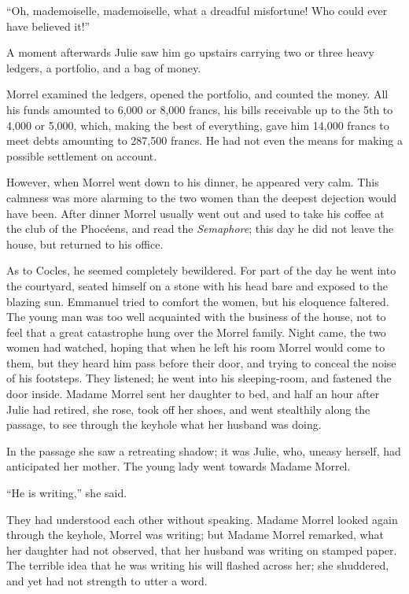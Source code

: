 “Oh, mademoiselle, mademoiselle, what a dreadful misfortune! Who could
ever have believed it!”

A moment afterwards Julie saw him go upstairs carrying two or three
heavy ledgers, a portfolio, and a bag of money.

Morrel examined the ledgers, opened the portfolio, and counted the
money. All his funds amounted to 6,000 or 8,000 francs, his bills
receivable up to the 5th to 4,000 or 5,000, which, making the best of
everything, gave him 14,000 francs to meet debts amounting to 287,500
francs. He had not even the means for making a possible settlement on
account.

However, when Morrel went down to his dinner, he appeared very calm.
This calmness was more alarming to the two women than the deepest
dejection would have been. After dinner Morrel usually went out and
used to take his coffee at the club of the Phocéens, and read the
\textit{Semaphore}; this day he did not leave the house, but returned to his
office.

As to Cocles, he seemed completely bewildered. For part of the day he
went into the courtyard, seated himself on a stone with his head bare
and exposed to the blazing sun. Emmanuel tried to comfort the women,
but his eloquence faltered. The young man was too well acquainted with
the business of the house, not to feel that a great catastrophe hung
over the Morrel family. Night came, the two women had watched, hoping
that when he left his room Morrel would come to them, but they heard
him pass before their door, and trying to conceal the noise of his
footsteps. They listened; he went into his sleeping-room, and fastened
the door inside. Madame Morrel sent her daughter to bed, and half an
hour after Julie had retired, she rose, took off her shoes, and went
stealthily along the passage, to see through the keyhole what her
husband was doing.

In the passage she saw a retreating shadow; it was Julie, who, uneasy
herself, had anticipated her mother. The young lady went towards Madame
Morrel.

“He is writing,” she said.

They had understood each other without speaking. Madame Morrel looked
again through the keyhole, Morrel was writing; but Madame Morrel
remarked, what her daughter had not observed, that her husband was
writing on stamped paper. The terrible idea that he was writing his
will flashed across her; she shuddered, and yet had not strength to
utter a word.

